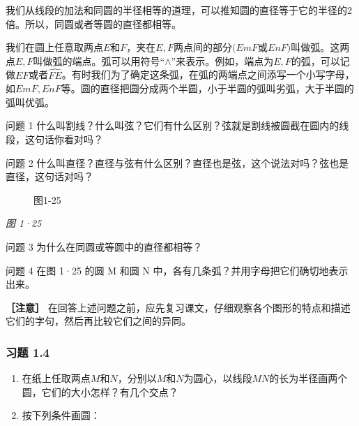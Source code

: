 我们从线段的加法和同圆的半径相等的道理，可以推知圆的直径等于它的半径的2倍。所以，同圆或者等圆的直径都相等。

我们在圆上任意取两点\(E\)和\(F\)，夹在\(E, F\)两点间的部分\((EmF\)或\(EnF)\)叫做弧。这两点\(E, F\)叫做弧的端点。弧可以用符号``\(\wedge\)''来表示。例如，端点为\(E, F\)的弧，可以记做\(EF\)或者\(\widehat{FE}\)。有时我们为了确定这条弧，在弧的两端点之间添写一个小写字母，如\(EmF, EnF\)等。圆的直径把圆分成两个半圆，小于半圆的弧叫劣弧，大于半圆的弧叫优弧。

问题 1
什么叫割线？什么叫弦？它们有什么区别？弦就是割线被圆截在圆内的线段，这句话你看对吗？

问题 2
什么叫直径？直径与弦有什么区别？直径也是弦，这个说法对吗？弦也是直径，这句话对吗？

\begin{figure}
\centering
{}
\caption{图1-25}
\end{figure}

\emph{图 1·25}

问题 3 为什么在同圆或等圆中的直径都相等？

问题 4 在图 1·25 的圆 M 和圆 N
中，各有几条弧？并用字母把它们确切地表示出来。

\textbf{［注意］}
在回答上述问题之前，应先复习课文，仔细观察各个图形的特点和描述它们的字句，然后再比较它们之间的异同。

\subsubsection{习题 1.4}

\begin{enumerate}
\item
  在纸上任取两点\(M\)和\(N\)，分别以\(M\)和\(N\)为圆心，以线段\(MN\)的长为半径画两个圆，它们的大小怎样？有几个交点？
\item
  按下列条件画圆：
\end{enumerate}

